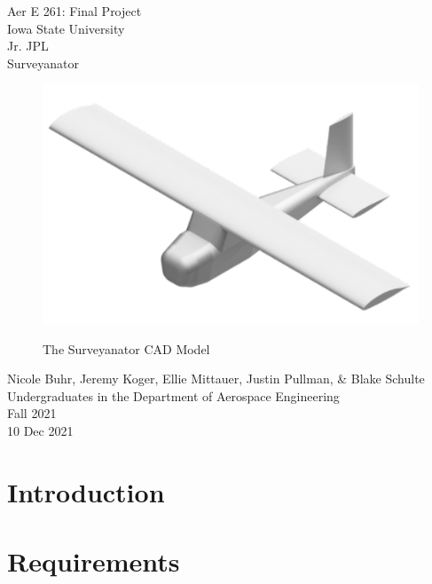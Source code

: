 \documentclass[12pt,A4paper]{article}
\begin{document}
	\thispagestyle{empty}
	\begin{center}
		\Huge
		Aer E 261: Final Project \\
		Iowa State University \\
		Jr. JPL \\
		Surveyanator \\
		\vspace{0.25 in}
		
		
		\begin{figure}[!h]
			\centering
			\vspace{0.5 in}
			\includegraphics[width=1\textwidth]{IsoCad.png}
			\label{fig:f1}
			\caption{The Surveyanator CAD Model}
		\end{figure}
		\vspace*{\fill}
		\large
		Nicole Buhr, Jeremy Koger, Ellie Mittauer, Justin Pullman, \& Blake Schulte \\
		\vspace{0.25 in}
		Undergraduates in the Department of Aerospace Engineering \\
		Fall 2021 \\
		10 Dec 2021 
		\clearpage
	\end{center}

	
	\setcounter{page}{2}
	
	\tableofcontents

	\renewcommand\listfigurename{List of Illustrations}
	\listoffigures

	\clearpage
	\section{Introduction}
	\section{Requirements}
\end{document}

